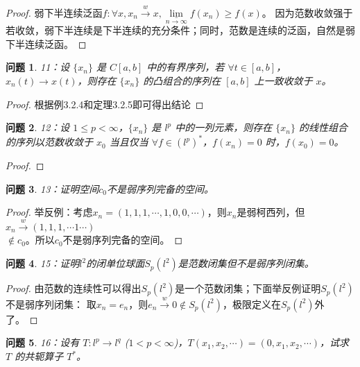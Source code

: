 \documentclass[a4paper, 12pt]{ctexart}
\newtheorem*{theorem}{问题}%
\begin{document}
\begin{proof}
弱下半连续泛函$f:\forall x, x_n \overset{w}{\rightarrow} x, \underset{n \to \infty}{\underline{\lim}} f(x_n)\geq f(x)$。
因为范数收敛强于若收敛，弱下半连续是下半连续的充分条件；同时，范数是连续的泛函，自然是弱下半连续泛函。
\end{proof}

\begin{theorem}
11：设 $\{x_n\}$ 是 $C[a,b]$ 中的有界序列，若 $\forall t \in [a,b]$，$x_n(t) \rightarrow x(t)$，则存在 $\{x_n\}$ 的凸组合的序列在 $[a,b]$ 上一致收敛于 $x$。
\end{theorem}

\begin{proof}
根据例3.2.4和定理3.2.5即可得出结论
\end{proof}

\begin{theorem}
12：设 $1 \leqslant p < \infty$，$\{x_n\}$ 是 $l^p$ 中的一列元素，则存在 $\{x_n\}$ 的线性组合的序列以范数收敛于 $x_0$ 当且仅当 $\forall f \in (l^p)^*$，$f(x_n) = 0$ 时，$f(x_0) = 0$。
\end{theorem}

\begin{proof}

\end{proof}

\begin{theorem}
13：证明空间$c_0$不是弱序列完备的空间。
\end{theorem}

\begin{proof}
举反例：考虑$x_n=(1,1,1,\cdots,1,0,0,\cdots)$，则$x_n$是弱柯西列，但$x_n \overset{w}{\rightarrow}(1,1,1,\cdots 1 \cdots)$ \\ $\notin c_0$。所以$c_0$不是弱序列完备的空间。
\end{proof}

\begin{theorem}
15：证明$l^2$的闭单位球面$S_p(l^2)$是范数闭集但不是弱序列闭集。
\end{theorem}

\begin{proof}
由范数的连续性可以得出$S_p(l^2)$是一个范数闭集；下面举反例证明$S_p(l^2)$不是弱序列闭集：
取$x_n=e_n$，则$e_n\overset{w}{\rightarrow}0 \notin S_p(l^2)$，极限定义在$S_p(l^2)$外了。
\end{proof}

\begin{theorem}
16：设有 $T: l^p \rightarrow l^q$ ($1 < p < \infty$)，$T(x_1, x_2, \cdots) = (0, x_1, x_2, \cdots)$，试求 $T$ 的共轭算子 $T^*$。
\end{theorem}
\end{document}
